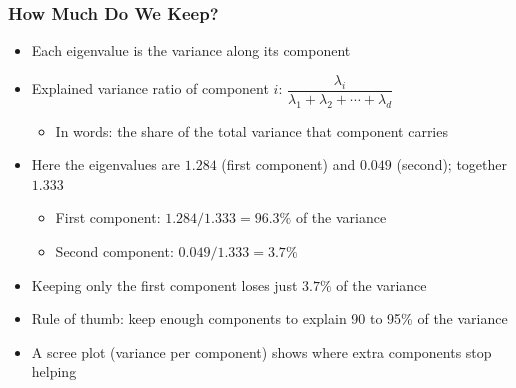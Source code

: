 \begin{frame}[fragile] \frametitle{How Much Do We Keep?}
\begin{itemize}
\item Each eigenvalue is the variance along its component
\item Explained variance ratio of component $i$: $\dfrac{\lambda_i}{\lambda_1 + \lambda_2 + \cdots + \lambda_d}$
\begin{itemize}
\item In words: the share of the total variance that component carries
\end{itemize}
\item Here the eigenvalues are $1.284$ (first component) and $0.049$ (second); together $1.333$
\begin{itemize}
\item First component: $1.284 / 1.333 = 96.3\%$ of the variance
\item Second component: $0.049 / 1.333 = 3.7\%$
\end{itemize}
\item Keeping only the first component loses just $3.7\%$ of the variance
\item Rule of thumb: keep enough components to explain 90 to 95\% of the variance
\item A scree plot (variance per component) shows where extra components stop helping
\end{itemize}
\end{frame}


